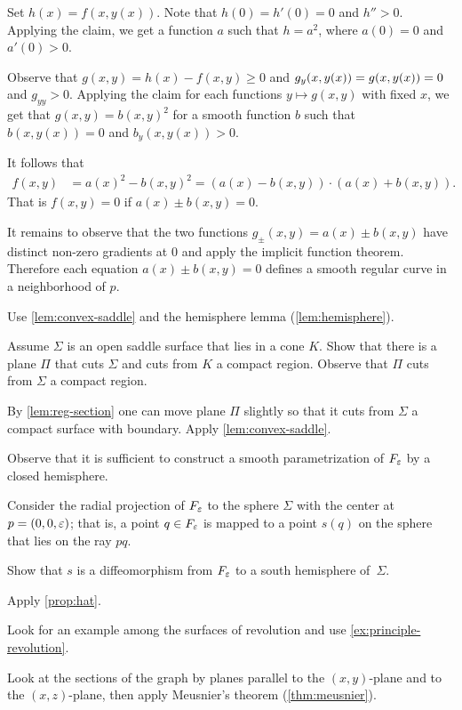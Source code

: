 Set $h(x)=f(x,y(x))$.
Note that $h(0)=h'(0)=0$ and $h''>0$.
Applying the claim, we get a function $a$ such that $h=a^2$, where $a(0)=0$ and $a'(0)>0$.

Observe that $g(x,y)=h(x)-f(x,y)\ge 0$ and $g_y(x,y(x))\z=g(x,y(x))\z=0$ and $g_{yy}>0$.
Applying the claim for each functions $y\mapsto g(x,y)$ with fixed $x$, we get that $g(x,y)=b(x,y)^2$ for a smooth function $b$ such that 
$b(x,y(x))=0$ and $b_y(x,y(x))>0$.

It follows that 
\begin{align*}
f(x,y)&=a(x)^2-b(x,y)^2=
(a(x)-b(x,y))\cdot (a(x)+b(x,y)).
\end{align*}
That is $f(x,y)=0$ if $a(x)\pm b(x,y) =0$.

It remains to observe that the two functions $g_\pm(x,y)=a(x)\pm b(x,y)$ have distinct non-zero gradients at $0$ and apply the implicit function theorem.
Therefore each equation $a(x)\pm b(x,y) =0$ defines a smooth regular curve in a neighborhood of $p$.





 Use \ref{lem:convex-saddle} and the hemisphere lemma (\ref{lem:hemisphere}).

Assume $\Sigma$ is an open saddle surface that lies in a cone $K$.
Show that there is a plane $\Pi$ that cuts $\Sigma$ and cuts from $K$ a compact region.
Observe that $\Pi$ cuts from $\Sigma$ a compact region.

By \ref{lem:reg-section} one can move plane $\Pi$ slightly so that it cuts from $\Sigma$ a compact surface with boundary.
Apply \ref{lem:convex-saddle}.


 Observe that it is sufficient to construct a smooth parametrization of $F_\varepsilon$ by a closed hemisphere.

Consider the radial projection of $F_\varepsilon$ to the sphere $\Sigma$ with the center at $p=(0,0,\varepsilon)$;
that is, a point $q\in F_\varepsilon$ is mapped to a point $s(q)$ on the sphere that lies on the ray $pq$.

Show that $s$ is a diffeomorphism from $F_\varepsilon$ to a south hemisphere of~$\Sigma$.

 Apply \ref{prop:hat}.


 Look for an example among the surfaces of revolution and use \ref{ex:principle-revolution}.

 Look at the sections of the graph by planes parallel to the $(x,y)$-plane and to the $(x,z)$-plane, then apply Meusnier’s theorem (\ref{thm:meusnier}).

